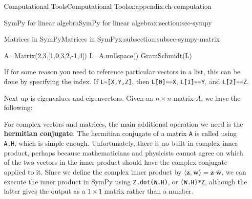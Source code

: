 \documentclass[oneside,10pt,]{book}
\newcommand{\mono}[1]{\texttt{#1}}
\newcommand{\terminology}[1]{\textbf{#1}}
\numberwithin{equation}{section}
\newenvironment{codedisplay}
{\VerbatimEnvironment\begin{center}\begin{lrbox}{\codedisplaybox}\begin{BVerbatim}}
{\end{BVerbatim}\end{lrbox}\usebox{\codedisplaybox}\end{center}}
\newcommand{\dotp}{\!\boldsymbol{\cdot}\!}
\newcommand{\zz}{\mathbf{z}}
\newcommand{\ww}{\mathbf{w}}
\begin{document}
\begin{appendixptx}{Computational Tools}{}{Computational Tools}{}{}{x:appendix:ch-computation}
\begin{sectionptx}{SymPy for linear algebra}{}{SymPy for linear algebra}{}{}{x:section:sec-sympy}
\begin{subsectionptx}{Matrices in SymPy}{}{Matrices in SymPy}{}{}{x:subsection:subsec-sympy-matrix}
\begin{sageinput}
A=Matrix(2,3,[1,0,3,2,-1,4])
L=A.nullspace()
GramSchmidt(L)
\end{sageinput}
If for some reason you need to reference particular vectors in a list, this can be done by specifying the index. If \mono{L=[X,Y,Z]}, then \mono{L[0]==X}, \mono{L[1]==Y}, and \mono{L[2]==Z}.%
\par
Next up is eigenvalues and eigenvectors. Given an \(n\times n\) matrix \(A\), we have the following:%
%
\par
For complex vectors and matrices, the main additional operation we need is the \terminology{hermitian conjugate}. The hermitian conjugate of a matrix \mono{A} is called using \mono{A.H}, which is simple enough. Unfortunately, there is no built-in complex inner product, perhaps because mathematicians and physicists cannot agree on which of the two vectors in the inner product should have the complex conjugate applied to it. Since we define the complex inner product by \(\langle \zz,\ww\rangle = \zz\dotp\bar{\ww}\), we can execute the inner product in SymPy using \mono{Z.dot(W.H)}, or \mono{(W.H)*Z}, although the latter gives the output as a \(1\times 1\) matrix rather than a number.%
\par

\end{subsectionptx}
\end{sectionptx}
\end{appendixptx}
\end{document}
